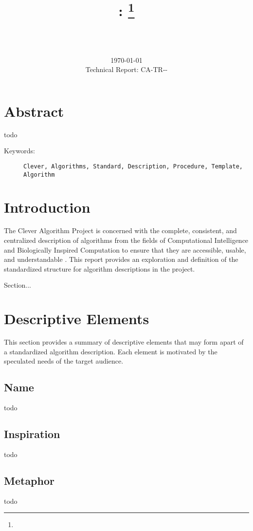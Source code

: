 \documentclass[a4paper, 11pt]{article}
\title{{\myreporttitle}: {\myreportsubtitle}\footnote{\myreportlicense}}
\author{\myreportauthor\\{\myreportemail}\\\small\myreportproject}
\date{\today\\{\small{Technical Report: CA-TR-{\myreportdate}-\myreportversion}}}
\begin{document}
\maketitle

\section*{Abstract} 
todo

\begin{description}
	\item[Keywords:] {\small\texttt{Clever, Algorithms, Standard, Description, Procedure, Template, Algorithm}}
\end{description} 

\section{Introduction}
\label{sec:introduction}
The Clever Algorithm Project is concerned with the complete, consistent, and centralized description of algorithms from the fields of Computational Intelligence and Biologically Inspired Computation to ensure that they are accessible, usable, and understandable \cite{Brownlee2010}.
This report provides an exploration and definition of the standardized structure for algorithm descriptions in the project.

Section...

\section{Descriptive Elements}
\label{sec:elements}
This section provides a summary of descriptive elements that may form apart of a standardized algorithm description. Each element is motivated by the speculated needs of the target audience.

\subsection{Name}
todo

\subsection{Inspiration}
todo

\subsection{Metaphor}
todo
\end{document}
